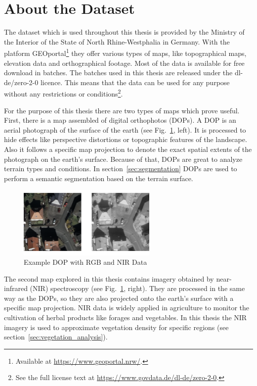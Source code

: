 \section{About the Dataset}
\label{sec:dataset_analysis}
The dataset which is used throughout this thesis is provided by the Ministry of the Interior of the State of North Rhine-Westphalia in Germany. With the platform GEOportal\footnote{Available at \url{https://www.geoportal.nrw/}.} they offer various types of maps, like topographical maps, elevation data and orthographical footage. Most of the data is available for free download in batches. The batches used in this thesis are released under the dl-de/zero-2-0 licence. This means that the data can be used for any purpose without any restrictions or conditions\footnote{See the full license text at \url{https://www.govdata.de/dl-de/zero-2-0}.}.

For the purpose of this thesis there are two types of maps which prove useful. First, there is a map assembled of digital orthophotos (DOPs). A DOP is an aerial photograph of the surface of the earth (see Fig.~\ref{fig:dop_rgb_nir_example}, left). It is processed to hide effects like perspective distortions or topographic features of the landscape. Also it follows a specific map projection to denote the exact spatial extents of the photograph on the earth's surface. Because of that, DOPs are great to analyze terrain types and conditions. In section~\ref{sec:segmentation} DOPs are used to perform a semantic segmentation based on the terrain surface.

\begin{figure}[h]
    \centering
    \includegraphics[width=0.6\textwidth]{images/dop_rgb_nir_example}
    \caption{Example DOP with RGB and NIR Data}
    \label{fig:dop_rgb_nir_example}
\end{figure}

The second map explored in this thesis contains imagery obtained by near-infrared (NIR) spectroscopy (see Fig.~\ref{fig:dop_rgb_nir_example}, right). They are processed in the same way as the DOPs, so they are also projected onto the earth's surface with a specific map projection. NIR data is widely applied in agriculture to monitor the cultivation of herbal products like forages and vegetables. In this thesis the NIR imagery is used to approximate vegetation density for specific regions (see section~\ref{sec:vegetation_analysis}).


